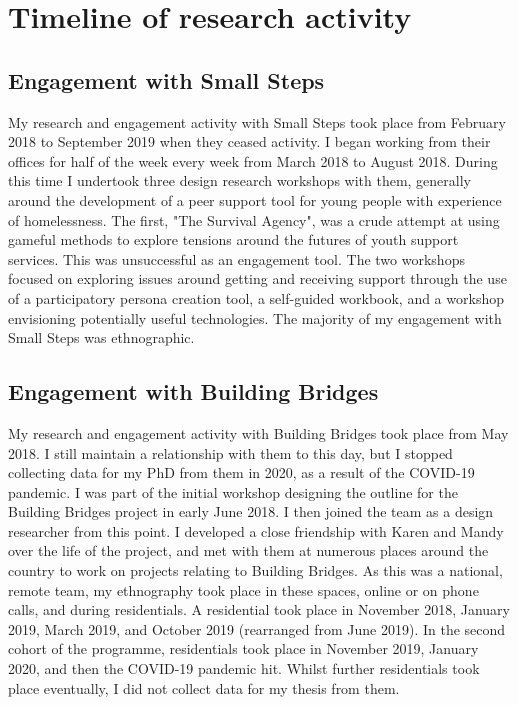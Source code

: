 
\chapter{Timeline of research activity}
\label{appendix:timeline}
\section{Engagement with Small Steps}
My research and engagement activity with Small Steps took place from February 2018 to September 2019 when they ceased activity. I began working from their offices for half of the week every week from March 2018 to August 2018. During this time I undertook three design research workshops with them, generally around the development of a peer support tool for young people with experience of homelessness. The first, "The Survival Agency", was a crude attempt at using gameful methods to explore tensions around the futures of youth support services. This was unsuccessful as an engagement tool. The two workshops focused on exploring issues around getting and receiving support through the use of a participatory persona creation tool, a self-guided workbook, and a workshop envisioning potentially useful technologies. The majority of my engagement with Small Steps was ethnographic. 

\section{Engagement with Building Bridges}
My research and engagement activity with Building Bridges took place from May 2018. I still maintain a relationship with them to this day, but I stopped collecting data for my PhD from them in 2020, as a result of the COVID-19 pandemic. I was part of the initial workshop designing the outline for the Building Bridges project in early June 2018. I then joined the team as a design researcher from this point. I developed a close friendship with Karen and Mandy over the life of the project, and met with them at numerous places around the country to work on projects relating to Building Bridges. As this was a national, remote team, my ethnography took place in these spaces, online or on phone calls, and during residentials. A residential took place in November 2018, January 2019, March 2019, and October 2019 (rearranged from June 2019). In the second cohort of the programme, residentials took place in November 2019, January 2020, and then the COVID-19 pandemic hit. Whilst further residentials took place eventually, I did not collect data for my thesis from them. 

